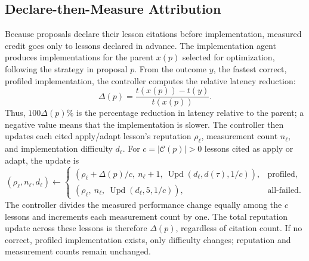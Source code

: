 \documentclass[acmsmall,screen,review,anonymous,nonacm]{acmart}
\begin{document}
\subsection{Declare-then-Measure Attribution}
\label{sec:attribution}

Because proposals declare their lesson citations before implementation, measured
credit goes only to lessons declared in advance.
The implementation agent produces implementations for the parent $x(p)$ selected for
optimization, following the strategy in proposal $p$. From the outcome $y$, the fastest correct, profiled implementation, the controller computes the relative latency reduction:
\begin{equation}
  \Delta(p)=\frac{t(x(p))-t(y)}{t(x(p))}.
  \label{eq:delta}
\end{equation}
Thus, $100\Delta(p)\%$ is the percentage reduction in latency relative to the
parent; a negative value means that the implementation is slower.
The controller then updates each cited apply/adapt lesson's reputation $\rho_\ell$,
measurement count $n_\ell$, and implementation difficulty $d_\ell$.
For $c=|\mathcal{C}(p)|>0$ lessons cited as apply or adapt, the update is
\begin{equation}
  (\rho_\ell,n_\ell,d_\ell)\leftarrow
  \begin{cases}
    (\rho_\ell+\Delta(p)/c,\ n_\ell+1,\ \operatorname{Upd}(d_\ell,d(\tau),1/c)),
      & \text{profiled},\\
    (\rho_\ell,\ n_\ell,\ \operatorname{Upd}(d_\ell,5,1/c)),
      & \text{all-failed}.
  \end{cases}
  \label{eq:credit-update}
\end{equation}
The controller divides the measured performance change equally among the $c$
lessons and increments each measurement count by one. The total reputation update
across these lessons is therefore $\Delta(p)$, regardless of citation count.
If no correct, profiled
implementation exists, only difficulty changes; reputation and measurement counts
remain unchanged.
\end{document}
